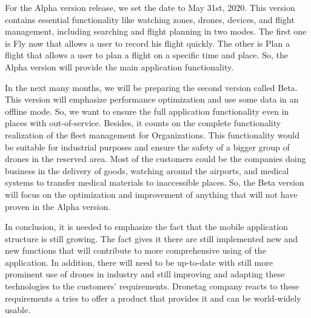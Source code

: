 For the Alpha version release, we set the date to May 31st, 2020.
This version contains essential functionality like watching zones, drones, devices, and flight management, including searching and flight planning in two modes.
The first one is Fly now that allows a user to record his flight quickly.
The other is Plan a flight that allows a user to plan a flight on a specific time and place.
So, the Alpha version will provide the main application functionality.

In the next many months, we will be preparing the second version called Beta.
This version will emphasize performance optimization and use some data in an offline mode.
So, we want to ensure the full application functionality even in places with out-of-service.
Besides, it counts on the complete functionality realization of the fleet management for Organizations.
This functionality would be suitable for industrial purposes and ensure the safety of a bigger group of drones in the reserved area.
Most of the customers could be the companies doing business in the delivery of goods, watching around the airports, and medical systems to transfer medical materials to inaccessible places.
So, the Beta version will focus on the optimization and improvement of anything that will not have proven in the Alpha version.

In conclusion, it is needed to emphasize the fact that the mobile application structure is still growing.
The fact gives it there are still implemented new and new functions that will contribute to more comprehensive using of the application.
In addition, there will need to be up-to-date with still more prominent use of drones in industry and still improving and adapting these technologies to the customers’ requirements.
Dronetag company reacts to these requirements a tries to offer a product that provides it and can be world-widely usable.


